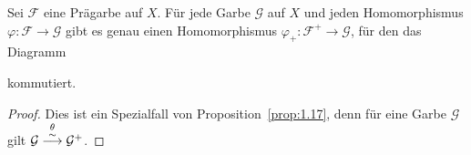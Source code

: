 \begin{kor}
	Sei $\mathcal{F}$ eine Prägarbe auf $X$. Für jede Garbe $\mathcal{G}$ auf $X$ und jeden Homomorphismus $\varphi\colon \mathcal{F} \to \mathcal{G}$ gibt es genau einen Homomorphismus $\varphi_+\colon \mathcal{F}^+ \to \mathcal{G}$, für den das Diagramm
	\begin{center}
	\end{center}
	kommutiert.
	\begin{proof}
		Dies ist ein Spezialfall von Proposition~\ref{prop:1.17}, denn für eine Garbe $\mathcal{G}$ gilt $\mathcal{G} \overset{\theta}{\overset{\sim}{\longrightarrow}}\mathcal{G}^+$.
	\end{proof}
\end{kor}
